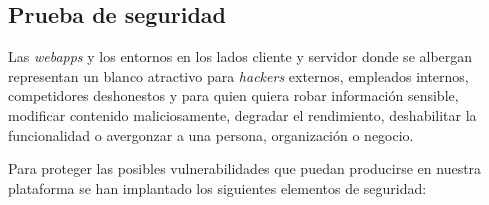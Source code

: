 \subsection{Prueba de seguridad}


Las \textit{webapps} y los entornos en los lados cliente y servidor donde se albergan representan un blanco atractivo para \textit{hackers} externos, empleados internos, competidores deshonestos y para quien quiera robar información sensible, modificar contenido maliciosamente, degradar el rendimiento, deshabilitar la funcionalidad o  avergonzar a una persona, organización o negocio.



Para proteger las posibles vulnerabilidades que puedan producirse en nuestra plataforma se han implantado los siguientes elementos de seguridad:


